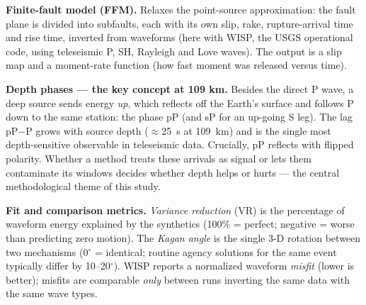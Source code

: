 \documentclass[11pt]{article}
\begin{document}
\textbf{Finite-fault model (FFM).} Relaxes the point-source approximation: the fault plane is
divided into subfaults, each with its own slip, rake, rupture-arrival time and rise time,
inverted from waveforms (here with WISP, the USGS operational code, using teleseismic P, SH,
Rayleigh and Love waves). The output is a slip map and a moment-rate function (how fast moment
was released versus time).

\textbf{Depth phases --- the key concept at 109 km.} Besides the direct P wave, a deep source
sends energy \emph{up}, which reflects off the Earth's surface and follows P down to the same
station: the phase pP (and sP for an up-going S leg). The lag pP$-$P grows with source depth
($\approx$25~s at 109~km) and is the single most depth-sensitive observable in teleseismic
data. Crucially, pP reflects with flipped polarity. Whether a method treats these arrivals as
signal or lets them contaminate its windows decides whether depth helps or hurts --- the
central methodological theme of this study.

\textbf{Fit and comparison metrics.} \emph{Variance reduction} (VR) is the percentage of
waveform energy explained by the synthetics (100\% = perfect; negative = worse than predicting
zero motion). The \emph{Kagan angle} is the single 3-D rotation between two mechanisms
(0$^\circ$ = identical; routine agency solutions for the same event typically differ by
10--20$^\circ$). WISP reports a normalized waveform \emph{misfit} (lower is better); misfits
are comparable \emph{only} between runs inverting the same data with the same wave types.
\end{document}

